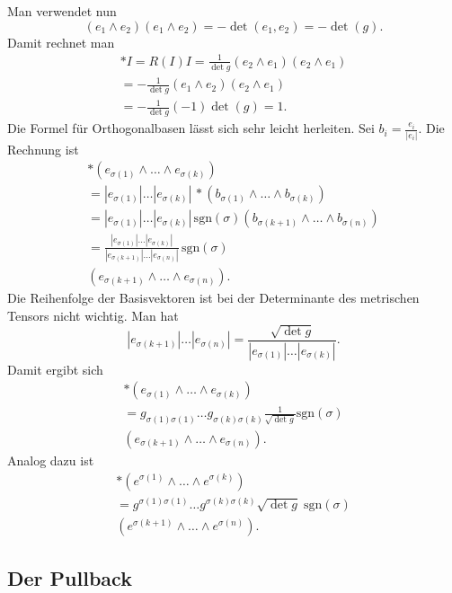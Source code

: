 \documentclass[a4paper,10pt,fleqn,twocolumn,twoside]{article}
\numberwithin{equation}{section}
\begin{document}
Man verwendet nun
\[(e_1\wedge e_2)(e_1\wedge e_2) = -\det(e_1,e_2) = -\det(g).\]
Damit rechnet man
\begin{gather}
*I = R(I)I = \frac{1}{\det g}(e_2\wedge e_1)(e_2\wedge e_1)\\
= -\frac{1}{\det g}(e_1\wedge e_2)(e_2\wedge e_1)\\
= -\frac{1}{\det g}(-1)\det(g) = 1.
\end{gather}
%
Die Formel für Orthogonalbasen lässt sich sehr leicht herleiten.
Sei $b_i=\frac{e_i}{|e_i|}$. Die Rechnung ist
\begin{gather*}
*(e_{\sigma(1)}\wedge\ldots\wedge e_{\sigma(k)})\\
= |e_{\sigma(1)}|\ldots|e_{\sigma(k)}|\,
{*}(b_{\sigma(1)}\wedge\ldots\wedge b_{\sigma(k)})\\
= |e_{\sigma(1)}|\ldots|e_{\sigma(k)}|\,
\mathrm{sgn}(\sigma)(b_{\sigma(k+1)}
\wedge\ldots\wedge b_{\sigma(n)})\\
= \frac{|e_{\sigma(1)}|\ldots|e_{\sigma(k)}|}
{|e_{\sigma(k+1)}|\ldots|e_{\sigma(n)}|}\,
\mathrm{sgn}(\sigma)\\
(e_{\sigma(k+1)} \wedge\ldots\wedge e_{\sigma(n)}).
\end{gather*}
Die Reihenfolge der Basisvektoren ist bei der Determinante
des metrischen Tensors nicht wichtig. Man hat
\begin{equation}
|e_{\sigma(k+1)}|\ldots|e_{\sigma(n)}|
= \frac{\sqrt{\det g}}{|e_{\sigma(1)}|\ldots|e_{\sigma(k)}|}.
\end{equation}
Damit ergibt sich
\begin{gather*}
*(e_{\sigma(1)}\wedge\ldots\wedge e_{\sigma(k)})\\
= g_{\sigma(1)\sigma(1)}\ldots g_{\sigma(k)\sigma(k)}
\frac{1}{\sqrt{\det g}} \mathrm{sgn}(\sigma)\\
(e_{\sigma(k+1)} \wedge\ldots\wedge e_{\sigma(n)}).
\end{gather*}
Analog dazu ist
\begin{gather*}
*(e^{\sigma(1)}\wedge\ldots\wedge e^{\sigma(k)})\\
= g^{\sigma(1)\sigma(1)}\ldots g^{\sigma(k)\sigma(k)}
\sqrt{\det g}\;\mathrm{sgn}(\sigma)\\
(e^{\sigma(k+1)} \wedge\ldots\wedge e^{\sigma(n)}).
\end{gather*}

\subsection{Der Pullback}
\end{document}
